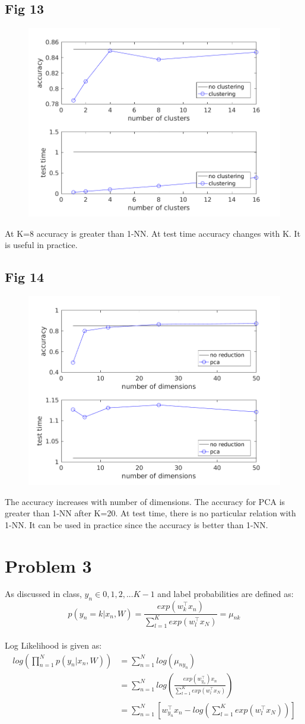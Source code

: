 \documentclass{article}
\begin{document}
\subsection{Fig 13}
\begin{figure}[h!]
\begin{center}
\includegraphics[width=0.5\columnwidth]{RunResults2/13.png}
\label{13}
\end{center}
\end{figure}
At K=8 accuracy is greater than 1-NN. At test time accuracy changes with K. It is useful in practice.


\subsection{Fig 14}
\begin{figure}[h!]
\begin{center}
\includegraphics[width=0.5\columnwidth]{RunResults2/14.png}
\label{14}
\end{center}
\end{figure}
The accuracy increases with number of dimensions. The accuracy for PCA is greater than 1-NN after K=20. At test time, there is no particular relation with 1-NN. It can be used in practice since the accuracy is better than 1-NN.
\section{Problem 3}
As discussed in class, $y_n \in {0,1,2, ... K-1}$ and label probabilities are defined as:
$$p(y_n=k|x_n,W) = \frac{exp(w_k^\top x_n)}{\sum_{l=1}^{K}exp(w_l^\top x_N)} = \mu_{nk}$$
\\
Log Likelihood is given as:
\begin{equation*}
\begin{aligned}
log(\prod_{n=1}^N p(y_n|x_n,W)) &=  \sum_{n=1}^N log(\mu_{ny_n}) \\
&=  \sum_{n=1}^N log(\frac{exp(w_{y_n}^\top)x_n}{\sum_{l=1}^K exp(w_l^\top x_N)}) \\ 
&= \sum_{n=1}^N [w_{y_n}^\top x_n - log(\sum_{l=1}^K exp(w_l^\top x_N))] \\ 
\end{aligned}
\end{equation*}
\end{document}

